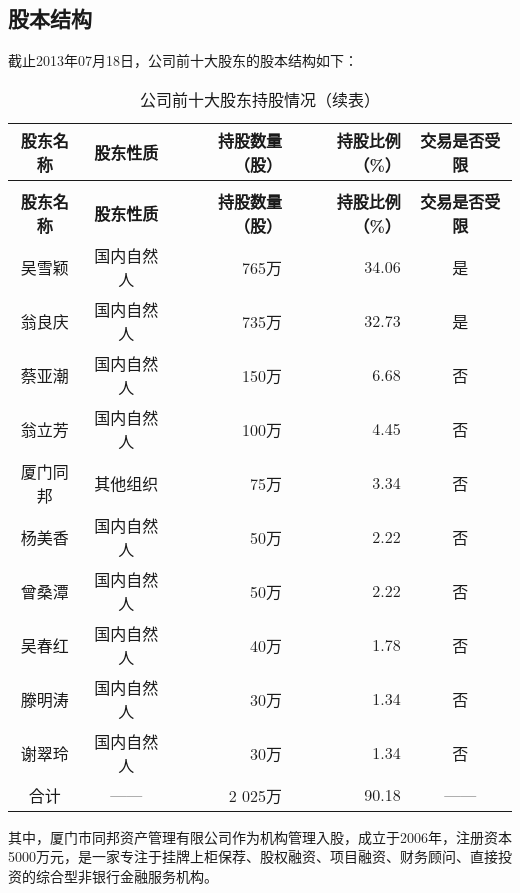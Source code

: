 \subsection{股本结构}
截止2013年07月18日，公司前十大股东的股本结构如下： %
\renewcommand*{\arraystretch}{1}
\setlength{\tabcolsep}{8pt}
\begin{longtable}{>{\footnotesize}c>{\footnotesize}c>{\footnotesize}r>{\footnotesize}r>{\footnotesize}c}
\caption[公司前十大股东]{公司前十大股东持股情况}\\  %
\hline\hline
\rowcolor{mycyan} \bfseries 股东名称	&	\bfseries 股东性质	&	\bfseries 持股数量（股）	&	\bfseries 持股比例（\%）	&	\bfseries 交易是否受限	\\  \endfirsthead          %
\caption[]{公司前十大股东持股情况（续表）} \\ 
\hline\hline
\rowcolor{mycyan} \bfseries 股东名称	&	\bfseries 股东性质	&	\bfseries 持股数量（股）	&	\bfseries 持股比例（\%）	&	\bfseries 交易是否受限	\\   \endhead         %
\hline
\endfoot
\hline   %
吴雪颖	&	国内自然人	&	765万	&	34.06	&	是	\\
翁良庆	&	国内自然人	&	735万	&	32.73	&	是	\\
蔡亚潮	&	国内自然人	&	150万	&	6.68	&	否	\\
翁立芳	&	国内自然人	&	100万	&	4.45	&	否	\\
厦门同邦	&	其他组织	&	75万	&	3.34	&	否	\\
杨美香	&	国内自然人	&	50万	&	2.22	&	否	\\
曾桑潭	&	国内自然人	&	50万	&	2.22	&	否	\\
吴春红	&	国内自然人	&	40万	&	1.78	&	否	\\
滕明涛	&	国内自然人	&	30万	&	1.34	&	否	\\
谢翠玲	&	国内自然人	&	30万	&	1.34	&	否	\\
\midrule
合计	&	——	&	2 025万	&	90.18	&		—— 	\\
\bottomrule
\end{longtable}
\begin{note}
其中，厦门市同邦资产管理有限公司作为机构管理入股，成立于2006年，注册资本5000万元，是一家专注于挂牌上柜保荐、股权融资、项目融资、财务顾问、直接投资的综合型非银行金融服务机构。
\end{note}
